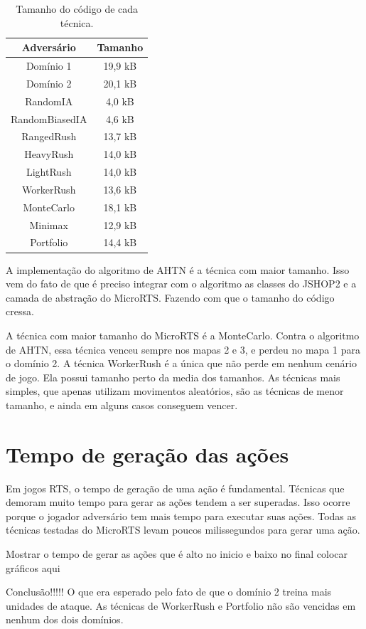 \begin{table}[ht]
	\centering
	\caption{Tamanho do código de cada técnica.}
	\label{tab:tamanho}
	\begin{tabular}{|c|c|}
		\hline
		\textbf{Adversário} & \textbf{Tamanho} \\ \hline
		Domínio 1           & 19,9 kB          \\ \hline
		Domínio 2           & 20,1 kB          \\ \hline
		RandomIA            & 4,0 kB           \\ \hline
		RandomBiasedIA      & 4,6 kB           \\ \hline
		RangedRush          & 13,7 kB          \\ \hline
		HeavyRush           & 14,0 kB          \\ \hline
		LightRush           & 14,0 kB          \\ \hline
		WorkerRush          & 13,6 kB          \\ \hline
		MonteCarlo          & 18,1 kB          \\ \hline
		Minimax             & 12,9 kB          \\ \hline
		Portfolio           & 14,4 kB          \\ \hline
	\end{tabular}
\end{table}

A implementação do algoritmo de AHTN é a técnica com maior tamanho.
Isso vem do fato de que é preciso integrar com o algoritmo as classes do JSHOP2 e a camada de abstração do MicroRTS.
Fazendo com que o tamanho do código cressa.

A técnica com maior tamanho do MicroRTS é a MonteCarlo.
Contra o algoritmo de AHTN, essa técnica venceu sempre nos mapas 2 e 3, e perdeu no mapa 1 para o domínio 2.
A técnica WorkerRush é a única que não perde em nenhum cenário de jogo.
Ela possui tamanho perto da media dos tamanhos.
As técnicas mais simples, que apenas utilizam movimentos aleatórios, são as técnicas de menor tamanho, e ainda em alguns casos conseguem vencer.

\section{Tempo de geração das ações}

Em jogos RTS, o tempo de geração de uma ação é fundamental.
Técnicas que demoram muito tempo para gerar as ações tendem a ser superadas.
Isso ocorre porque o jogador adversário tem mais tempo para executar suas ações.
Todas as técnicas testadas do MicroRTS levam poucos milissegundos para gerar uma ação.

Mostrar o tempo de gerar as ações que é alto no inicio e baixo no final
colocar gráficos aqui 


Conclusão!!!!!
O que era esperado pelo fato de que o domínio 2 treina mais unidades de ataque.
As técnicas de WorkerRush e Portfolio não são vencidas em nenhum dos dois domínios.



